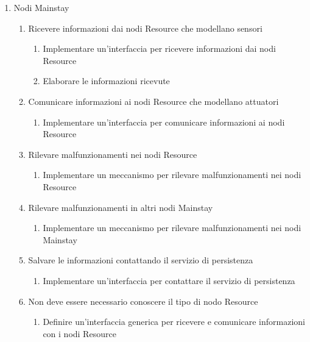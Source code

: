 \begin{enumerate}
    \item Nodi Mainstay
          \begin{enumerate}
              \item Ricevere informazioni dai nodi Resource che modellano sensori
                    \begin{enumerate}
                        \item Implementare un'interfaccia per ricevere informazioni dai nodi Resource
                        \item Elaborare le informazioni ricevute
                    \end{enumerate}
              \item Comunicare informazioni ai nodi Resource che modellano attuatori
                    \begin{enumerate}
                        \item Implementare un'interfaccia per comunicare informazioni ai nodi Resource
                    \end{enumerate}
              \item Rilevare malfunzionamenti nei nodi Resource
                    \begin{enumerate}
                        \item Implementare un meccanismo per rilevare malfunzionamenti nei nodi Resource
                    \end{enumerate}
              \item Rilevare malfunzionamenti in altri nodi Mainstay
                    \begin{enumerate}
                        \item Implementare un meccanismo per rilevare malfunzionamenti nei nodi Mainstay
                    \end{enumerate}
              \item Salvare le informazioni contattando il servizio di persistenza
                    \begin{enumerate}
                        \item Implementare un'interfaccia per contattare il servizio di persistenza
                    \end{enumerate}
              \item Non deve essere necessario conoscere il tipo di nodo Resource
                    \begin{enumerate}
                        \item Definire un'interfaccia generica per ricevere e comunicare informazioni con i nodi Resource

\end{enumerate}
\end{enumerate}
\end{enumerate}
